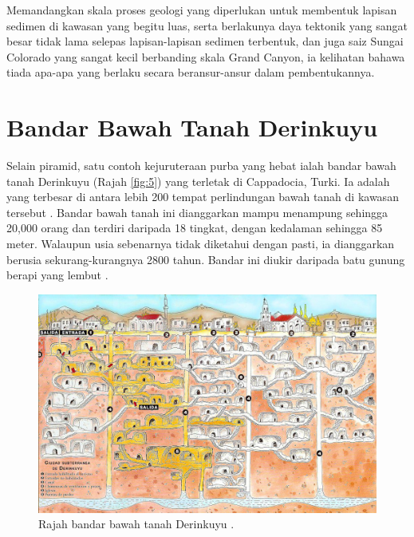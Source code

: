 \documentclass[10pt,twocolumn,letterpaper]{article}
\begin{document}
Memandangkan skala proses geologi yang diperlukan untuk membentuk lapisan sedimen di kawasan yang begitu luas, serta berlakunya daya tektonik yang sangat besar tidak lama selepas lapisan-lapisan sedimen terbentuk, dan juga saiz Sungai Colorado yang sangat kecil berbanding skala Grand Canyon, ia kelihatan bahawa tiada apa-apa yang berlaku secara beransur-ansur dalam pembentukannya.

\section{Bandar Bawah Tanah Derinkuyu}

Selain piramid, satu contoh kejuruteraan purba yang hebat ialah bandar bawah tanah Derinkuyu (Rajah \ref{fig:5}) yang terletak di Cappadocia, Turki. Ia adalah yang terbesar di antara lebih 200 tempat perlindungan bawah tanah di kawasan tersebut \cite{54}. Bandar bawah tanah ini dianggarkan mampu menampung sehingga 20,000 orang dan terdiri daripada 18 tingkat, dengan kedalaman sehingga 85 meter. Walaupun usia sebenarnya tidak diketahui dengan pasti, ia dianggarkan berusia sekurang-kurangnya 2800 tahun. Bandar ini diukir daripada batu gunung berapi yang lembut \cite{52, 53}.

\begin{figure}[b]
\begin{center}

   \includegraphics[width=1\linewidth]{derinkuyu.jpeg}
\end{center}
   \caption{Rajah bandar bawah tanah Derinkuyu \cite{56}.}
\label{fig:5}
\label{fig:onecol}
\end{figure}
\end{document}
